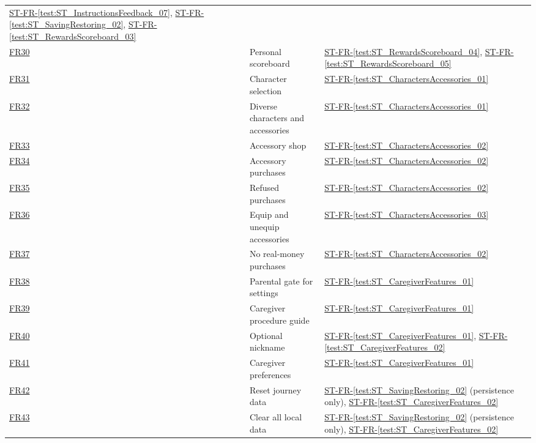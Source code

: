 \documentclass[10pt,titlepage]{article}
\newcommand{\frtestref}[1]{%
    \hyperref[test:#1]{ST-FR-\ref*{test:#1}}}
\newcommand{\srsurl}{https://team-hindsight.github.io/ophthamology-game/SRS/SRS.pdf}
\newcommand{\srsfrref}[2]{\href{\srsurl\#nameddest=#1}{FR#2}}
\begin{document}
\begin{longtable}{@{}>{\raggedright\arraybackslash}p{}
  >{\raggedright\arraybackslash}p{}
  >{\raggedright\arraybackslash}p{}@{}}
  \frtestref{ST_InstructionsFeedback_07}, \frtestref{ST_SavingRestoring_02}, \frtestref{ST_RewardsScoreboard_03}\\
\srsfrref{FR_Scoreboard}{30} & Personal scoreboard &
  \frtestref{ST_RewardsScoreboard_04}, \frtestref{ST_RewardsScoreboard_05}\\
\srsfrref{FR_ChooseCharacter}{31} & Character selection & \frtestref{ST_CharactersAccessories_01}\\
\srsfrref{FR_DiverseCharacters}{32} & Diverse characters and accessories & \frtestref{ST_CharactersAccessories_01}\\
\srsfrref{FR_Shop}{33} & Accessory shop & \frtestref{ST_CharactersAccessories_02}\\
\srsfrref{FR_Purchase}{34} & Accessory purchases & \frtestref{ST_CharactersAccessories_02}\\
\srsfrref{FR_PurchaseRefused}{35} & Refused purchases & \frtestref{ST_CharactersAccessories_02}\\
\srsfrref{FR_Equip}{36} & Equip and unequip accessories & \frtestref{ST_CharactersAccessories_03}\\
\srsfrref{FR_NoRealMoney}{37} & No real-money purchases & \frtestref{ST_CharactersAccessories_02}\\
\srsfrref{FR_ParentGate}{38} & Parental gate for settings & \frtestref{ST_CaregiverFeatures_01}\\
\srsfrref{FR_ProcedureGuide}{39} & Caregiver procedure guide & \frtestref{ST_CaregiverFeatures_01}\\
\srsfrref{FR_Nickname}{40} & Optional nickname &
  \frtestref{ST_CaregiverFeatures_01}, \frtestref{ST_CaregiverFeatures_02}\\
\srsfrref{FR_Preferences}{41} & Caregiver preferences & \frtestref{ST_CaregiverFeatures_01}\\
\srsfrref{FR_ResetJourney}{42} & Reset journey data &
  \frtestref{ST_SavingRestoring_02} (persistence only), \frtestref{ST_CaregiverFeatures_02}\\
\srsfrref{FR_ClearAllData}{43} & Clear all local data &
  \frtestref{ST_SavingRestoring_02} (persistence only), \frtestref{ST_CaregiverFeatures_02}\\


\end{longtable}
\end{document}
